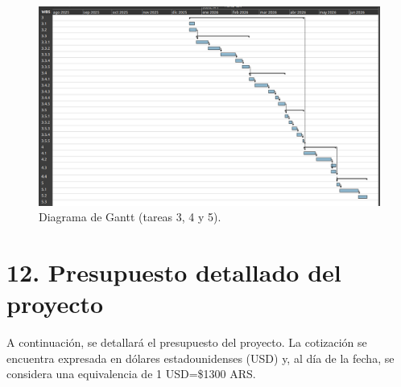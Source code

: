 \documentclass[
11pt, %
]{charter}
\begin{document}
\begin{landscape}
\begin{figure}
\centering 
\includegraphics[scale=0.7]{./Figuras/gantt_2.png}
\caption{Diagrama de Gantt (tareas 3, 4 y 5).}
\label{fig:gantt2}
\end{figure}

\end{landscape}





\section{12. Presupuesto detallado del proyecto}
\label{sec:presupuesto}

A continuación, se detallará el presupuesto del proyecto. La cotización se encuentra expresada en dólares estadounidenses (USD) y, al día de la fecha, se considera una equivalencia de 1 USD=\$1300 ARS.
\end{document}
